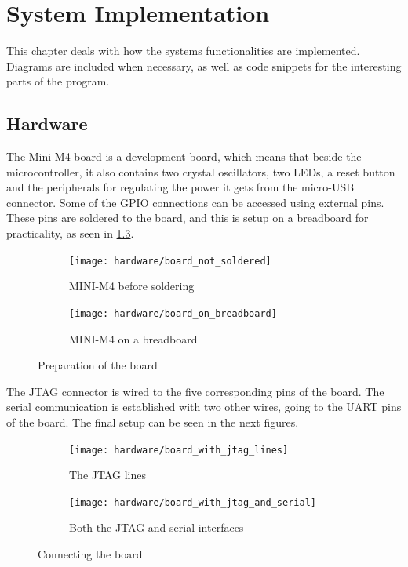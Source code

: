 
\newcommand{\excreturn}{EXC\_RETURN}

\chapter{System Implementation}
This chapter deals with how the system\textquotesingle s functionalities
are implemented. Diagrams are included when necessary, as well as code
snippets for the interesting parts of the program.


\section{Hardware}
The Mini-M4 board is a development board, which means that beside the
microcontroller, it also contains two crystal oscillators, two LEDs, a reset
button and the peripherals for regulating the power it gets from
the micro-USB connector.
Some of the GPIO connections can be accessed using external pins.
These pins are soldered to the board, and this is setup on a breadboard
for practicality, as seen in \ref{fig:photo1}.

\begin{figure}[H]
\begin{subfigure}{0.5\textwidth}
  \centering
  \texttt{[image: hardware/board\_not\_soldered]}
  \caption{MINI-M4 before soldering}
  \label{fig:sub1}
\end{subfigure}%
\begin{subfigure}{0.5\textwidth}
  \centering
  \texttt{[image: hardware/board\_on\_breadboard]}
  \caption{MINI-M4 on a breadboard}
  \label{fig:sub2}
\end{subfigure}
\caption{Preparation of the board}
\label{fig:photo1}
\end{figure}

The JTAG connector is wired to the five corresponding pins of the
board. The serial communication is established with two other wires, going
to the UART pins of the board.
The final setup can be seen in the next figures.

\begin{figure}[H]
\begin{subfigure}{.5\textwidth}
  \centering
  \texttt{[image: hardware/board\_with\_jtag\_lines]}
  \caption{The JTAG lines}
  \label{fig:sub1}
\end{subfigure}%
\begin{subfigure}{.5\textwidth}
  \centering
  \texttt{[image: hardware/board\_with\_jtag\_and\_serial]}
  \caption{Both the JTAG and serial interfaces}
  \label{fig:sub2}
\end{subfigure}
\caption{Connecting the board}
\label{fig:photo2}
\end{figure}

